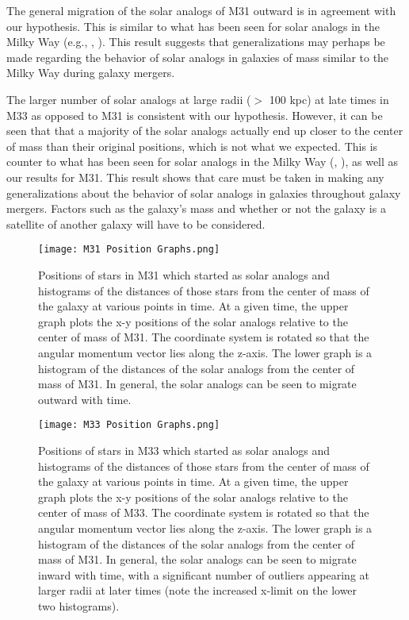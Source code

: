 \documentclass{aastex63}
\begin{document}
The general migration of the solar analogs of M31 outward is in agreement with our hypothesis. This is similar to what has been seen for solar analogs in the Milky Way (e.g., \cite{cox08}, \cite{van12}). This result suggests that generalizations may perhaps be made regarding the behavior of solar analogs in galaxies of mass similar to the Milky Way during galaxy mergers. 

The larger number of solar analogs at large radii ($>$ 100 kpc) at late times in M33 as opposed to M31 is consistent with our hypothesis. However, it can be seen that that a majority of the solar analogs actually end up closer to the center of mass than their original positions, which is not what we expected. This is counter to what has been seen for solar analogs in the Milky Way (\cite{cox08}, \cite{van12}), as well as our results for M31. This result shows that care must be taken in making any generalizations about the behavior of solar analogs in galaxies throughout galaxy mergers. Factors such as the galaxy's mass and whether or not the galaxy is a satellite of another galaxy will have to be considered. 




\begin{figure}
    \centering
    \texttt{[image: M31 Position Graphs.png]}
    \caption{Positions of stars in M31 which started as solar analogs and histograms of the distances of those stars from the center of mass of the galaxy at various points in time. At a given time, the upper graph plots the x-y positions of the solar analogs relative to the center of mass of M31. The coordinate system is rotated so that the angular momentum vector lies along the z-axis. The lower graph is a histogram of the distances of the solar analogs from the center of mass of M31. In general, the solar analogs can be seen to migrate outward with time.}
    \label{m31positiongraphs}
\end{figure}

\begin{figure}
    \centering
    \texttt{[image: M33 Position Graphs.png]}
    \caption{Positions of stars in M33 which started as solar analogs and histograms of the distances of those stars from the center of mass of the galaxy at various points in time. At a given time, the upper graph plots the x-y positions of the solar analogs relative to the center of mass of M33. The coordinate system is rotated so that the angular momentum vector lies along the z-axis. The lower graph is a histogram of the distances of the solar analogs from the center of mass of M31. In general, the solar analogs can be seen to migrate inward with time, with a significant number of outliers appearing at larger radii at later times (note the increased x-limit on the lower two histograms).}
    \label{m33positiongraphs}
\end{figure}

{}

\end{document}
